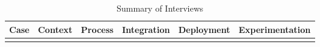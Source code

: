 \documentclass[english]{tktltiki2}
\begin{document}
\begin{landscape}

    \footnotesize

    \begin{longtable}{|p{2.5cm}|p{1.5cm}|p{4cm}|p{4cm}|p{4cm}|p{4cm}|}

        \caption{Summary of Interviews} \\

        \hline

        \textbf{Case} & \textbf{Context} & \textbf{Process} & \textbf{Integration} & \textbf{Deployment} & \textbf{Experimentation} \\

        \hline

        \endhead

        \label{table:summary-of-interviews}


\end{longtable}
\end{landscape}
\end{document}
